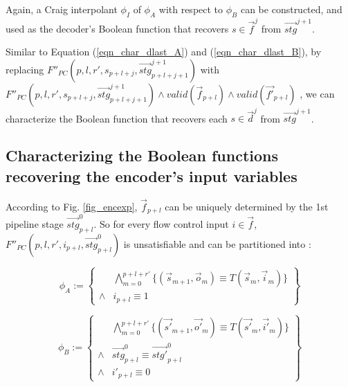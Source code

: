 \documentclass[conference]{IEEEtran}
\begin{document}
Again,
a Craig interpolant $\phi_I$ of $\phi_A$ with respect to $\phi_B$ can be constructed,
and used as the decoder's Boolean function that recovers $s\in\vec{f}^{j}$ from $\vec{stg}^{j+1}$.

Similar to Equation (\ref{eqn_char_dlast_A}) and (\ref{eqn_char_dlast_B}),
by replacing $F''_{PC}(p,l,r',s_{p+l+j},\vec{stg}^{j+1}_{p+l+j+1})$  with 
$F''_{PC}(p,l,r',s_{p+l+j},\vec{stg}^{j+1}_{p+l+j+1})\wedge valid(\vec{f}_{p+l})\wedge valid(\vec{f'}_{p+l})$ ,
we can characterize the Boolean function that recovers each $s\in\vec{d}^{j}$ from $\vec{stg}^{j+1}$.

\subsection{Characterizing the Boolean functions recovering the encoder's input variables}

According to Fig. \ref{fig_encexp},
$\vec{f}_{p+l}$ can be uniquely determined by the 1st pipeline stage $\vec{stg}^0_{p+l}$.
So for every flow control input $i\in\vec{f}$,
$F''_{PC}(p,l,r',i_{p+l},\vec{stg}^0_{p+l})$ is unsatisfiable and can be partitioned into :

\begin{equation}
\phi_A:=
\left\{
\begin{array}{cc}
&\bigwedge_{m=0}^{p+l+r'}
\{
(\vec{s}_{m+1},\vec{o}_m)\equiv T(\vec{s}_m,\vec{i}_m)
\}
\\
\wedge& i_{p+l}\equiv 1 
\end{array}
\right\}
\end{equation}

\begin{equation}
\phi_B:=
\left\{
\begin{array}{cc}
&\bigwedge_{m=0}^{p+l+r'}
\{
(\vec{s'}_{m+1},\vec{o'}_m)\equiv T(\vec{s'}_m,\vec{i'}_m)
\}
\\
\wedge&\vec{stg}^0_{p+l}\equiv \vec{stg'}^0_{p+l} \\
\wedge& i'_{p+l}\equiv 0 
\end{array}
\right\}
\end{equation}
\end{document}
